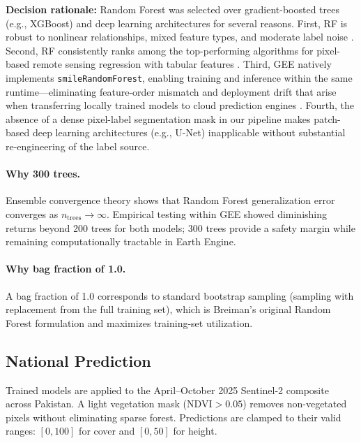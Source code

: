 \documentclass[12pt,a4paper,twoside]{article}
\newcommand{\NDVI}{\text{NDVI}}
\begin{document}
\textbf{Decision rationale:} Random Forest was selected over gradient-boosted trees
(e.g., XGBoost) and deep learning architectures for several reasons.  First, RF is
robust to nonlinear relationships, mixed feature types, and moderate label noise
\citep{Breiman2001}.  Second, RF consistently ranks among the top-performing
algorithms for pixel-based remote sensing regression with tabular features
\citep{Belgiu2016}.  Third, GEE natively implements \texttt{smileRandomForest},
enabling training and inference within the same runtime---eliminating feature-order
mismatch and deployment drift that arise when transferring locally trained models to
cloud prediction engines \citep{Gorelick2017}.  Fourth, the absence of a dense
pixel-label segmentation mask in our pipeline makes patch-based deep learning
architectures (e.g., U-Net) inapplicable without substantial re-engineering of the
label source.

\paragraph{Why 300 trees.}  Ensemble convergence theory \citep{Breiman2001} shows
that Random Forest generalization error converges as $n_{\text{trees}} \to \infty$.
Empirical testing within GEE showed diminishing returns beyond 200 trees for both
models; 300 trees provide a safety margin while remaining computationally tractable
in Earth Engine.

\paragraph{Why bag fraction of 1.0.}  A bag fraction of 1.0 corresponds to standard
bootstrap sampling (sampling with replacement from the full training set), which is
Breiman's original Random Forest formulation and maximizes training-set utilization.

\subsection{National Prediction}\label{sec:prediction}

Trained models are applied to the April--October 2025 Sentinel-2 composite across
Pakistan.  A light vegetation mask ($\NDVI > 0.05$) removes non-vegetated pixels
without eliminating sparse forest.  Predictions are clamped to their valid ranges:
$[0, 100]$ for cover and $[0, 50]$ for height.
\end{document}
